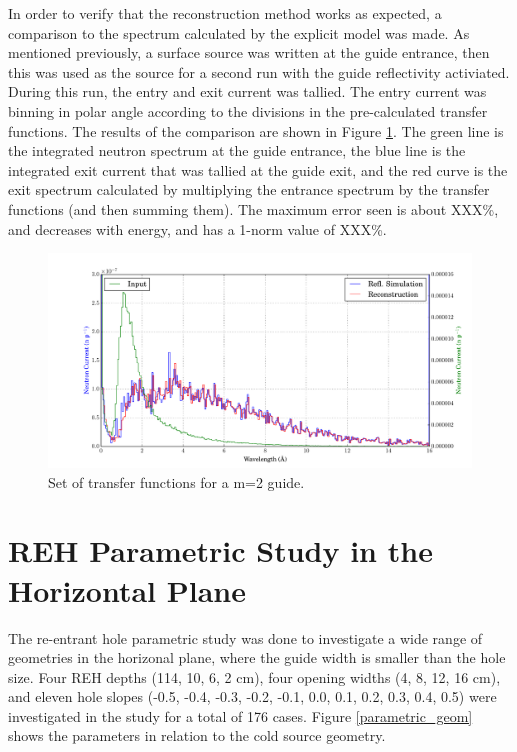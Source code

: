 \documentclass[a4paper]{jpconf}
\begin{document}
In order to verify that the reconstruction method works as expected, a comparison to the spectrum calculated by the explicit model was made.  As mentioned previously, a surface source was written at the guide entrance, then this was used as the source for a second run with the guide reflectivity activiated.  During this run, the entry and exit current was tallied.  The entry current was binning in polar angle according to the divisions in the pre-calculated transfer functions.  The results of the comparison are shown in Figure \ref{xfer_bench}.  The green line is the integrated neutron spectrum at the guide entrance, the blue line is the integrated exit current that was tallied at the guide exit, and the red curve is the exit spectrum calculated by multiplying the entrance spectrum by the transfer functions (and then summing them).  The maximum error seen is about XXX\%, and decreases with energy, and has a 1-norm value of XXX\%.

\begin{figure}
\begin{center}
\includegraphics[scale=0.4]{graphics/xfer_bench.pdf}
\end{center}
\caption{\label{xfer_bench}Set of transfer functions for a m=2 guide.}
\end{figure}

\section{REH Parametric Study in the Horizontal Plane}

The re-entrant hole parametric study was done to investigate a wide range of geometries in the horizonal plane, where the guide width is smaller than the hole size.  Four REH depths (114, 10, 6, 2 cm), four opening widths (4, 8, 12, 16 cm), and eleven hole slopes (-0.5, -0.4, -0.3, -0.2, -0.1, 0.0, 0.1, 0.2, 0.3, 0.4, 0.5) were investigated in the study for a total of 176 cases. Figure \ref{parametric_geom} shows the parameters in relation to the cold source geometry.
\end{document}
